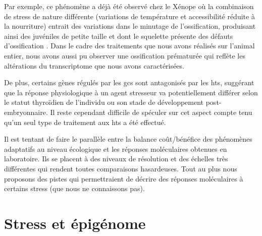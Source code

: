 \documentclass[../main.tex]{subfiles}
\begin{document}
	Par exemple, ce phénomène a déjà été observé chez le Xénope où la combinaison de stress de nature différente (variations de température et accessibilité réduite à la nourriture) entrait des variations dans le minutage de l’ossification, produisant ainsi des juvéniles de petite taille et dont le squelette présente des défauts d'ossification \citep{Gomez-Mestre2010}.
	Dans le cadre des traitements que nous avons réalisés sur l'animal entier, nous avons aussi pu observer une ossification prématurée qui reflète les altérations du transcriptome que nous avons caractérisées.
	\par
	De plus, certains gènes régulés par les \glspl{gc} sont antagonisés par les \glspl{ht}, suggérant que la réponse physiologique à un agent stresseur va potentiellement différer selon le statut thyroïdien de l'individu ou son stade de développement post-embryonnaire.
	Il reste cependant difficile de spéculer sur cet aspect compte tenu qu'un seul type de traitement aux \glspl{ht} a été effectué.
	\par
	Il est tentant de faire le parallèle entre la balance coût/bénéfice des phénomènes adaptatifs au niveau écologique et les réponses moléculaires obtenues en laboratoire.
	Ils se placent à des niveaux de résolution et des échelles très différentes qui rendent toutes comparaisons hasardeuses.
	Tout au plus nous proposons des pistes qui permettraient de décrire des réponses moléculaires à certains stress (que nous ne connaissons pas).


\section{Stress et épigénome}
\end{document}
